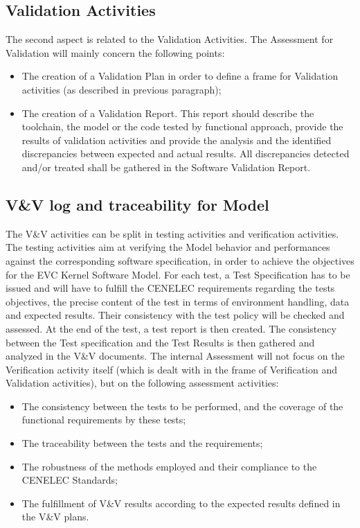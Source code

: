 \documentclass{template/openetcs_article}
\begin{document}
\subsection{Validation Activities}
The second aspect is related to the Validation Activities. The Assessment for Validation will mainly concern the following points:
\begin{itemize}
\item The creation of a Validation Plan in order to define a frame for Validation activities (as described in previous paragraph);
\item The creation of a Validation Report. This report should describe the toolchain, the model or the code tested by functional approach, provide the results
of validation activities and provide the analysis and the identified discrepancies between expected and actual results. All discrepancies detected and/or
treated shall be gathered in the Software Validation Report.
\end{itemize}

\subsection{V\&V log and traceability for Model}
The V\&V activities can be split in testing activities and verification activities. The testing activities aim at verifying the Model behavior and performances
against the corresponding software specification, in order to achieve the objectives for the EVC Kernel Software Model.
For each test, a Test Specification has to be issued and will have to fulfill the CENELEC requirements regarding the tests objectives, the precise content of
the test in terms of environment handling, data and expected results. Their consistency with the test policy will be checked and assessed. At the end of the
test, a test report is then created. The consistency between the Test specification and the Test Results is then gathered and analyzed in the V\&V documents.
The internal Assessment will not focus on the Verification activity itself (which is dealt with in the frame of Verification and Validation activities), but on
the following assessment activities:
\begin{itemize}
\item The consistency between the tests to be performed, and the coverage of the functional requirements by these tests;
\item The traceability between the tests and the requirements;
\item The robustness of the  methods employed and their compliance to the CENELEC Standards;
\item The fulfillment of V\&V results according to the expected results defined in the V\&V plans.
\end{itemize}
\end{document}
